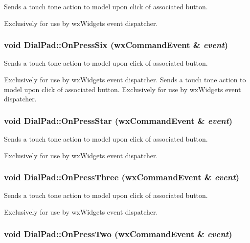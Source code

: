 Sends a touch tone action to model upon click of associated button. 

Exclusively for use by wxWidgets event dispatcher. \hypertarget{classDialPad_d6212054f7d5ff5a167376265b377bc7}{
\subsubsection[{OnPressSix}]{\setlength{\rightskip}{0pt plus 5cm}void DialPad::OnPressSix (wxCommandEvent \& {\em event})}}
\label{classDialPad_d6212054f7d5ff5a167376265b377bc7}


Sends a touch tone action to model upon click of associated button. 

Exclusively for use by wxWidgets event dispatcher. Sends a touch tone action to model upon click of associated button. Exclusively for use by wxWidgets event dispatcher. \hypertarget{classDialPad_69cd65cf785135fdfa246882965b77ec}{
\subsubsection[{OnPressStar}]{\setlength{\rightskip}{0pt plus 5cm}void DialPad::OnPressStar (wxCommandEvent \& {\em event})}}
\label{classDialPad_69cd65cf785135fdfa246882965b77ec}


Sends a touch tone action to model upon click of associated button. 

Exclusively for use by wxWidgets event dispatcher. \hypertarget{classDialPad_32214f7d206c448a7f25ceabaa32bdcb}{
\subsubsection[{OnPressThree}]{\setlength{\rightskip}{0pt plus 5cm}void DialPad::OnPressThree (wxCommandEvent \& {\em event})}}
\label{classDialPad_32214f7d206c448a7f25ceabaa32bdcb}


Sends a touch tone action to model upon click of associated button. 

Exclusively for use by wxWidgets event dispatcher. \hypertarget{classDialPad_dbf2a305725f08af6237df2c50eb92b6}{
\subsubsection[{OnPressTwo}]{\setlength{\rightskip}{0pt plus 5cm}void DialPad::OnPressTwo (wxCommandEvent \& {\em event})}}
\label{classDialPad_dbf2a305725f08af6237df2c50eb92b6}



